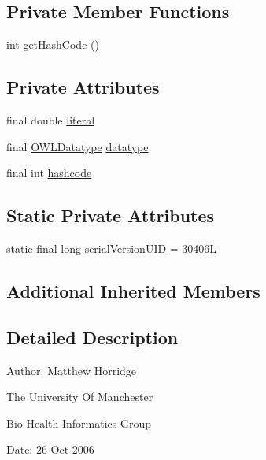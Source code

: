 \subsection*{Private Member Functions}
\begin{DoxyCompactItemize}
\item 
int \hyperlink{classuk_1_1ac_1_1manchester_1_1cs_1_1owl_1_1owlapi_1_1_o_w_l_literal_impl_double_a1c0312663384ad0e539bfbf713de3a04}{get\-Hash\-Code} ()
\end{DoxyCompactItemize}
\subsection*{Private Attributes}
\begin{DoxyCompactItemize}
\item 
final double \hyperlink{classuk_1_1ac_1_1manchester_1_1cs_1_1owl_1_1owlapi_1_1_o_w_l_literal_impl_double_a1e5abba77c29f863ad39e98d24284fd6}{literal}
\item 
final \hyperlink{interfaceorg_1_1semanticweb_1_1owlapi_1_1model_1_1_o_w_l_datatype}{O\-W\-L\-Datatype} \hyperlink{classuk_1_1ac_1_1manchester_1_1cs_1_1owl_1_1owlapi_1_1_o_w_l_literal_impl_double_a4ce7fb31d6c0c2530b4220c714a6d17f}{datatype}
\item 
final int \hyperlink{classuk_1_1ac_1_1manchester_1_1cs_1_1owl_1_1owlapi_1_1_o_w_l_literal_impl_double_a71ea8f3d516c297b4c522d6031968d34}{hashcode}
\end{DoxyCompactItemize}
\subsection*{Static Private Attributes}
\begin{DoxyCompactItemize}
\item 
static final long \hyperlink{classuk_1_1ac_1_1manchester_1_1cs_1_1owl_1_1owlapi_1_1_o_w_l_literal_impl_double_a25d76bce7fec4faa635f597ded20b1ba}{serial\-Version\-U\-I\-D} = 30406\-L
\end{DoxyCompactItemize}
\subsection*{Additional Inherited Members}


\subsection{Detailed Description}
Author\-: Matthew Horridge\par
 The University Of Manchester\par
 Bio-\/\-Health Informatics Group\par
 Date\-: 26-\/\-Oct-\/2006\par
 \par
 


